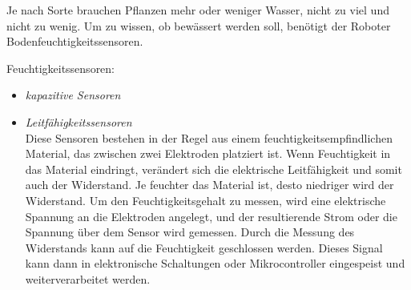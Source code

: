 Je nach Sorte brauchen Pflanzen mehr oder weniger Wasser, nicht zu viel und
nicht zu wenig. Um zu wissen, ob bewässert werden soll, benötigt der Roboter
Bodenfeuchtigkeitssensoren.

\begin{description}
	\item {Feuchtigkeitssensoren:}
	      \begin{itemize}
		      \item {\textit{kapazitive Sensoren}}\\
		            
		      \item {\textit{Leitfähigkeitssensoren}}\\
		            Diese Sensoren bestehen in der Regel aus einem feuchtigkeitsempfindlichen Material, das zwischen zwei Elektroden platziert ist. 
					Wenn Feuchtigkeit in das Material eindringt, verändert sich die elektrische Leitfähigkeit und somit auch der Widerstand. 
					Je feuchter das Material ist, desto niedriger wird der Widerstand.
		            Um den Feuchtigkeitsgehalt zu messen, wird eine elektrische Spannung an die
		            Elektroden angelegt, und der resultierende Strom oder die Spannung über dem
		            Sensor wird gemessen. Durch die Messung des Widerstands kann auf die
		            Feuchtigkeit geschlossen werden. Dieses Signal kann dann in elektronische
		            Schaltungen oder Mikrocontroller eingespeist und weiterverarbeitet werden.
	      \end{itemize}
\end{description}